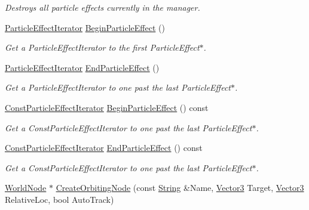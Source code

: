 \begin{DoxyCompactItemize}
\begin{DoxyCompactList}\small\item\em Destroys all particle effects currently in the manager. \item\end{DoxyCompactList}\item 
\hyperlink{classphys_1_1SceneManager_a668ef8db2053cc15cc48b21fa6240c3e}{ParticleEffectIterator} \hyperlink{classphys_1_1SceneManager_a603f8cbd672cf081f869af4392c8cb4b}{BeginParticleEffect} ()
\begin{DoxyCompactList}\small\item\em Get a ParticleEffectIterator to the first ParticleEffect$\ast$. \item\end{DoxyCompactList}\item 
\hyperlink{classphys_1_1SceneManager_a668ef8db2053cc15cc48b21fa6240c3e}{ParticleEffectIterator} \hyperlink{classphys_1_1SceneManager_acc2e73606de2ecd452a0231473bfc2e6}{EndParticleEffect} ()
\begin{DoxyCompactList}\small\item\em Get a ParticleEffectIterator to one past the last ParticleEffect$\ast$. \item\end{DoxyCompactList}\item 
\hyperlink{classphys_1_1SceneManager_a0026f62b121b0d7010a67a79fdc9000c}{ConstParticleEffectIterator} \hyperlink{classphys_1_1SceneManager_a2289b4e4a5c4a3bc63480a1b7bbd70f4}{BeginParticleEffect} () const 
\begin{DoxyCompactList}\small\item\em Get a ConstParticleEffectIterator to one past the last ParticleEffect$\ast$. \item\end{DoxyCompactList}\item 
\hyperlink{classphys_1_1SceneManager_a0026f62b121b0d7010a67a79fdc9000c}{ConstParticleEffectIterator} \hyperlink{classphys_1_1SceneManager_ac06259a883a3d380334fe9b097e859f3}{EndParticleEffect} () const 
\begin{DoxyCompactList}\small\item\em Get a ConstParticleEffectIterator to one past the last ParticleEffect$\ast$. \item\end{DoxyCompactList}\item 
\hyperlink{classphys_1_1WorldNode}{WorldNode} $\ast$ \hyperlink{classphys_1_1SceneManager_ad86be1c140e04c7579af80c1e33150fd}{CreateOrbitingNode} (const \hyperlink{namespacephys_aa03900411993de7fbfec4789bc1d392e}{String} \&Name, \hyperlink{classphys_1_1Vector3}{Vector3} Target, \hyperlink{classphys_1_1Vector3}{Vector3} RelativeLoc, bool AutoTrack)

\end{DoxyCompactItemize}

